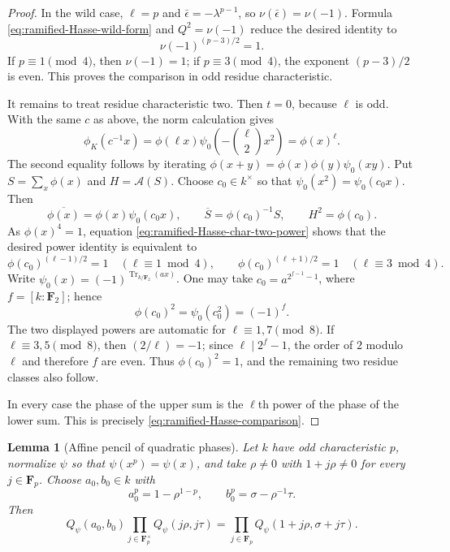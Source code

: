 \documentclass[11pt]{amsart}
\newtheorem{lemma}[theorem]{Lemma}
\theoremstyle{definition}
\theoremstyle{remark}
\newcommand{\F}{\mathbf F}
\newcommand{\Tr}{\operatorname{Tr}}
\newcommand{\Aphase}{\mathcal A}
\begin{document}
\begin{proof}
In the wild case, $\ell=p$ and
$\bar\epsilon=-\lambda^{p-1}$, so
$\nu(\bar\epsilon)=\nu(-1)$.  Formula
\eqref{eq:ramified-Hasse-wild-form} and $Q^2=\nu(-1)$ reduce the desired
identity to
\[
 \nu(-1)^{(p-3)/2}=1.
\]
If $p\equiv1\pmod4$, then $\nu(-1)=1$; if
$p\equiv3\pmod4$, the exponent $(p-3)/2$ is even.  This proves the
comparison in odd residue characteristic.

It remains to treat residue characteristic two.  Then $t=0$, because
$\ell$ is odd.  With the same $c$ as above, the norm calculation gives
\begin{equation}\label{eq:ramified-Hasse-char-two-power}
 \phi_K(c^{-1}x)
 =\phi(\ell x)\psi_0\!\left(-\binom{\ell}{2}x^2\right)
 =\phi(x)^\ell.
\end{equation}
The second equality follows by iterating
$\phi(x+y)=\phi(x)\phi(y)\psi_0(xy)$.  Put
$S=\sum_x\phi(x)$ and $H=\Aphase(S)$.  Choose $c_0\in k^\times$ so
that $\psi_0(x^2)=\psi_0(c_0x)$.  Then
\[
 \overline{\phi(x)}=\phi(x)\psi_0(c_0x),
 \qquad
 \overline S=\phi(c_0)^{-1}S,
 \qquad
 H^2=\phi(c_0).
\]
As $\phi(x)^4=1$, equation
\eqref{eq:ramified-Hasse-char-two-power} shows that the desired power
identity is equivalent to
\[
 \phi(c_0)^{(\ell-1)/2}=1\quad(\ell\equiv1\bmod4),
 \qquad
 \phi(c_0)^{(\ell+1)/2}=1\quad(\ell\equiv3\bmod4).
\]
Write $\psi_0(x)=(-1)^{\Tr_{k/\F_2}(a x)}$.  One may take
$c_0=a^{2^{f-1}-1}$, where $f=[k:\F_2]$; hence
\[
 \phi(c_0)^2=\psi_0(c_0^2)=(-1)^f.
\]
The two displayed powers are automatic for
$\ell\equiv1,7\pmod8$.  If $\ell\equiv3,5\pmod8$, then
$(2/\ell)=-1$; since $\ell\mid2^f-1$, the order of $2$ modulo
$\ell$ and therefore $f$ are even.  Thus $\phi(c_0)^2=1$, and the
remaining two residue classes also follow.

In every case the phase of the upper sum is the $\ell$th power of the
phase of the lower sum.  This is precisely
\eqref{eq:ramified-Hasse-comparison}.
\end{proof}

\begin{lemma}[Affine pencil of quadratic phases]\label{lem:affine-pencil}
Let $k$ have odd characteristic $p$, normalize $\psi$ so that
$\psi(x^p)=\psi(x)$, and take $\rho\neq0$ with
$1+j\rho\neq0$ for every $j\in\F_p$.  Choose $a_0,b_0\in k$ with
\[
 a_0^p=1-\rho^{1-p},\qquad
 b_0^p=\sigma-\rho^{-1}\tau.
\]
Then
\begin{equation}\label{eq:affine-pencil}
 Q_\psi(a_0,b_0)
 \prod_{j\in\F_p^\times}Q_\psi(j\rho,j\tau)
 =\prod_{j\in\F_p}Q_\psi(1+j\rho,\sigma+j\tau).
\end{equation}
\end{lemma}
\end{document}
